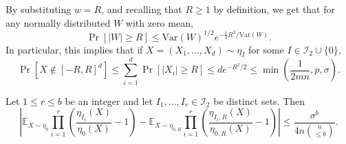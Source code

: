\documentclass[final, 12pt]{colt2018}
\begin{document}
By substituting $w = R$, and recalling that $R \ge 1$ by definition, we get that for any normally distributed $W$ with zero mean,
\begin{equation} \label{eq:tail-R}
\Pr[\lvert W \rvert \ge R] \le \mathrm{Var}(W)^{1/2} e^{-\frac{1}{2} R^2/\mathrm{Var}(W)}.
\end{equation}
In particular, this implies that if $X=(X_1,\dots, X_d) \sim \eta_I$ for some $I \in \mathcal{I}_2 \cup \{0\}$,
\begin{equation} \label{eq:tail-X}
\Pr\left[X \notin [-R,R]^d\right] 
\le \sum_{i=1}^d \Pr\left[ \left\lvert X_i \right\rvert \ge R \right]
\le d e^{-R^2/2}
\le \min \left(
\frac{1}{2mn},
p,
\sigma
\right).
\end{equation}
\begin{lemma} \label{lem:app-zero}
Let $1 \le r \le b$ be an integer and let $I_1,\dots,I_r \in \mathcal{I}_2$ be distinct sets. Then
\[
\left\lvert \mathbb{E}_{X\sim \eta_0} \prod_{i=1}^r \left( \frac{\eta_{I_i}(X)}{\eta_0(X)}-1 \right) 
-  \mathbb{E}_{X\sim \eta_{0,R}} \prod_{i=1}^r \left( \frac{\eta_{I_i,R}(X)}{\eta_{0,R}(X)}-1 \right) \right\rvert
\le \frac{\sigma^b}{4n {\binom{n}{\le b}}}.
\]
\end{lemma}
\end{document}
